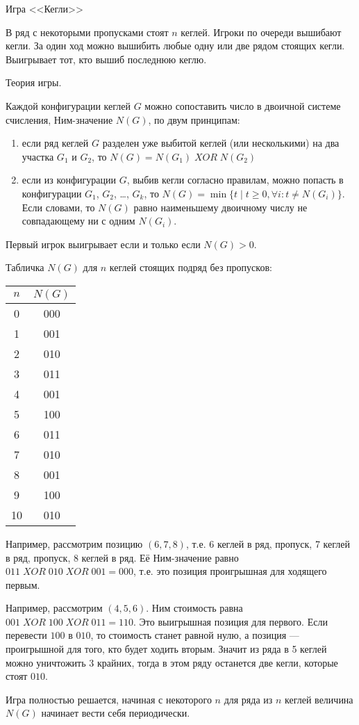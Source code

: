 \documentclass[12pt,a4paper]{article}
\begin{document}
Игра <<Кегли>>

В ряд с некоторыми пропусками стоят $n$  кеглей.  Игроки по очереди вышибают кегли. За один ход можно вышибить любые одну или две рядом стоящих кегли. Выигрывает тот, кто вышиб последнюю кеглю.

Теория игры.

Каждой конфигурации кеглей $G$ можно сопоставить число в двоичной системе счисления, Ним-значение $N(G)$, по двум принципам:
\begin{enumerate}
\item если ряд кеглей $G$ разделен уже выбитой кеглей (или несколькими) на два участка $G_1$ и $G_2$, то $N(G) = N(G_1)\; XOR \;N(G_2)$
\item если из конфигурации $G$, выбив кегли согласно правилам, можно попасть в конфигурации $G_1$, $G_2$, \ldots, $G_k$, то $N(G)=\min \{ t \mid t \geq 0,  \forall i: t \neq N(G_i) \}$. Если словами, то $N(G)$ равно наименьшему двоичному числу не совпадающему ни с одним $N(G_i)$.
\end{enumerate}

Первый игрок выигрывает если и только если $N(G)>0$.



Табличка $N(G)$ для $n$ кеглей стоящих подряд без пропусков:


\begin{tabular}{cc}
\hline 
$n$ & $N(G)$ \\ 
\hline 
0 & 000 \\ 
1 & 001 \\ 
2 & 010 \\ 
3 & 011 \\ 
4 & 001 \\ 
5 & 100 \\ 
6 & 011 \\ 
7 & 010 \\ 
8 & 001 \\ 
9 & 100 \\ 
10 & 010 \\ 
\hline 
\end{tabular} 


Например, рассмотрим позицию $(6,7,8)$, т.е. 6 кеглей в ряд, пропуск, 7 кеглей в ряд, пропуск, 8 кеглей в ряд. Её Ним-значение равно $011 \; XOR\; 010 \; XOR\; 001=000$, т.е. это позиция проигрышная для ходящего первым. 

Например, рассмотрим $(4,5,6)$. Ним стоимость равна $001\; XOR\; 100 \; XOR \; 011=110$. Это выигрышная позиция для первого. Если перевести $100$ в $010$, то стоимость станет равной нулю, а позиция --- проигрышной для того, кто будет ходить вторым. Значит из ряда в 5 кеглей можно уничтожить 3 крайних, тогда в этом ряду останется две кегли, которые стоят $010$. 

Игра полностью решается, начиная с некоторого $n$ для ряда из $n$ кеглей величина $N(G)$ начинает вести себя периодически.
\end{document}
